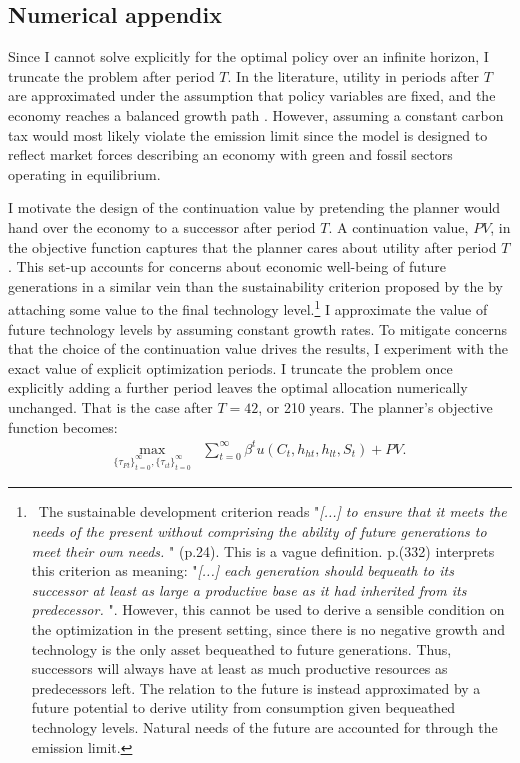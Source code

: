 \subsection{Numerical appendix}\label{app:PV}

Since I cannot solve explicitly for the optimal policy over an infinite horizon, I truncate the problem after period $T$. 
In the literature, utility in periods after $T$ are approximated under the assumption that policy variables are fixed, and the economy reaches a balanced growth path \citep{Barrage2019OptimalPolicy, Jones1993OptimalGrowth}. However, assuming a constant carbon tax would most likely violate the emission limit since the model is designed to reflect market forces describing an economy with green and fossil sectors operating in equilibrium. 


I motivate the design of the continuation value by pretending the planner would hand over the economy to a successor after period $T$. A continuation value, $PV$, in the objective function captures that the planner cares about utility after period $T$. 
This set-up accounts for concerns about economic well-being of future generations in a similar vein than the sustainability criterion proposed by the \cite{UNSUS} by attaching some value to the final technology level.\footnote{\ The sustainable development criterion reads "\textit{[...] to ensure that it meets the needs of the present without comprising the ability of future generations to meet their own needs.
	}" (p.24). This is a vague definition.  \cite{Dasgupta2021} p.(332) interprets this criterion as meaning: 
	"\textit{[...] each generation should bequeath to its successor at least as large a productive base as it had inherited from its predecessor. }". 
	However, this cannot be used to derive a sensible condition on the optimization in the present setting, since there is no negative growth and technology is the only asset bequeathed to future generations. Thus,
	successors will always have at least as much productive resources as predecessors left. The relation to the future is instead approximated by a future potential to derive utility from consumption given bequeathed technology levels. Natural needs of the future are accounted for through the emission limit. } I approximate the value of future technology levels by assuming constant growth rates.  
To mitigate concerns that the choice of the continuation value drives the results, I experiment with the exact value of explicit optimization periods. I truncate the problem once explicitly adding a further period leaves the optimal allocation numerically unchanged. That is the case after $T=42$, or 210 years. %
The planner's objective function becomes: 
\begin{align*}
\underset{\{\tau_{Ft}\}_{t=0}^{\infty},\{\tau_{\iota t}\}_{t=0}^{\infty}}{\max}&\sum_{t=0}^{\infty}\beta^t u(C_{t}, h_{ht}, h_{lt}, S_t)
+PV.
\end{align*}

